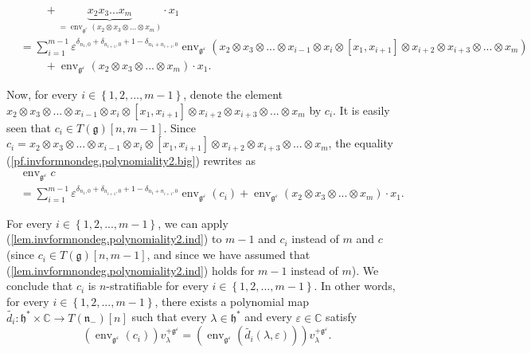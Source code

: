 \documentclass[etingof-lie.tex]{subfiles}
\begin{document}
\begin{align}
&  \ \ \ \ \ \ \ \ \ \ +\underbrace{x_{2}x_{3}...x_{m}}_{=\operatorname*{env}%
\nolimits_{\mathfrak{g}^{\varepsilon}}\left(  x_{2}\otimes x_{3}%
\otimes...\otimes x_{m}\right)  }\cdot x_{1}\nonumber\\
&  =\sum\limits_{i=1}^{m-1}\varepsilon^{\delta_{n_{1},0}+\delta_{n_{i+1}%
,0}+1-\delta_{n_{1}+n_{i+1},0}}\operatorname*{env}\nolimits_{\mathfrak{g}%
^{\varepsilon}}\left(  x_{2}\otimes x_{3}\otimes...\otimes x_{i-1}\otimes
x_{i}\otimes\left[  x_{1},x_{i+1}\right]  \otimes x_{i+2}\otimes
x_{i+3}\otimes...\otimes x_{m}\right) \nonumber\\
&  \ \ \ \ \ \ \ \ \ \ +\operatorname*{env}\nolimits_{\mathfrak{g}%
^{\varepsilon}}\left(  x_{2}\otimes x_{3}\otimes...\otimes x_{m}\right)  \cdot
x_{1}. \label{pf.invformnondeg.polynomiality2.big}%
\end{align}


Now, for every $i\in\left\{  1,2,...,m-1\right\}  $, denote the element
$x_{2}\otimes x_{3}\otimes...\otimes x_{i-1}\otimes x_{i}\otimes\left[
x_{1},x_{i+1}\right]  \otimes x_{i+2}\otimes x_{i+3}\otimes...\otimes x_{m}$
by $c_{i}$. It is easily seen that $c_{i}\in T\left(  \mathfrak{g}\right)
\left[  n,m-1\right]  $. Since \newline$c_{i}=x_{2}\otimes x_{3}%
\otimes...\otimes x_{i-1}\otimes x_{i}\otimes\left[  x_{1},x_{i+1}\right]
\otimes x_{i+2}\otimes x_{i+3}\otimes...\otimes x_{m}$, the equality
(\ref{pf.invformnondeg.polynomiality2.big}) rewrites as%
\begin{align}
&  \operatorname*{env}\nolimits_{\mathfrak{g}^{\varepsilon}}c\nonumber\\
&  =\sum\limits_{i=1}^{m-1}\varepsilon^{\delta_{n_{1},0}+\delta_{n_{i+1}%
,0}+1-\delta_{n_{1}+n_{i+1},0}}\operatorname*{env}\nolimits_{\mathfrak{g}%
^{\varepsilon}}\left(  c_{i}\right)  +\operatorname*{env}%
\nolimits_{\mathfrak{g}^{\varepsilon}}\left(  x_{2}\otimes x_{3}%
\otimes...\otimes x_{m}\right)  \cdot x_{1}.
\label{pf.invformnondeg.polynomiality2.small}%
\end{align}


For every $i\in\left\{  1,2,...,m-1\right\}  $, we can apply
(\ref{lem.invformnondeg.polynomiality2.ind}) to $m-1$ and $c_{i}$ instead of
$m$ and $c$ (since $c_{i}\in T\left(  \mathfrak{g}\right)  \left[
n,m-1\right]  $, and since we have assumed that
(\ref{lem.invformnondeg.polynomiality2.ind}) holds for $m-1$ instead of $m$).
We conclude that $c_{i}$ is $n$-stratifiable for every $i\in\left\{
1,2,...,m-1\right\}  $. In other words, for every $i\in\left\{
1,2,...,m-1\right\}  $, there exists a polynomial map $\widetilde{d_{i}%
}:\mathfrak{h}^{\ast}\times\mathbb{C}\rightarrow T\left(  \mathfrak{n}%
_{-}\right)  \left[  n\right]  $ such that every $\lambda\in\mathfrak{h}%
^{\ast}$ and every $\varepsilon\in\mathbb{C}$ satisfy%
\[
\left(  \operatorname*{env}\nolimits_{\mathfrak{g}^{\varepsilon}}\left(
c_{i}\right)  \right)  v_{\lambda}^{+\mathfrak{g}^{\varepsilon}}=\left(
\operatorname*{env}\nolimits_{\mathfrak{g}^{\varepsilon}}\left(
\widetilde{d_{i}}\left(  \lambda,\varepsilon\right)  \right)  \right)
v_{\lambda}^{+\mathfrak{g}^{\varepsilon}}.
\]
\end{document}

